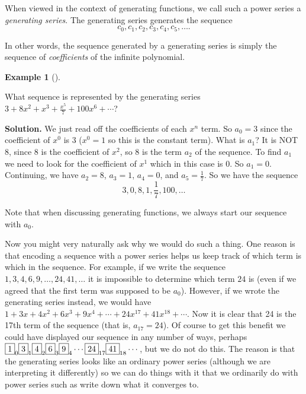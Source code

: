 \documentclass[10pt,]{book}
\theoremstyle{plain}
\theoremstyle{definition}
\newtheorem{example}[theorem]{Example}
\theoremstyle{definition}
\theoremstyle{definition}
\numberwithin{equation}{chapter}
\begin{document}
When viewed in the context of generating functions, we call such a power series a \emph{generating series}. The generating series generates the sequence
\begin{equation*}
  c_0, c_1, c_2, c_3, c_4, c_5, \ldots.
\end{equation*}
%
\par

In other words, the sequence generated by a generating series is simply the sequence of \emph{coefficients} of the infinite polynomial.
%
\begin{example}[]\label{example-109}

What sequence is represented by the generating series \(3 + 8x^2 + x^3 + \frac{x^5}{7} + 100x^6 + \cdots\)?
%
\par\medskip\noindent%
\textbf{Solution.}\quad
We just read off the coefficients of each \(x^n\) term. So \(a_0 = 3\) since the coefficient of \(x^0\) is 3 (\(x^0 = 1\) so this is the constant term). What is \(a_1\)? It is NOT 8, since 8 is the coefficient of \(x^2\), so 8 is the term \(a_2\) of the sequence. To find \(a_1\) we need to look for the coefficient of \(x^1\) which in this case is 0. So \(a_1 = 0\). Continuing, we have \(a_2 = 8\), \(a_3 = 1\), \(a_4 = 0\), and \(a_5 = \frac{1}{7}\). So we have the sequence
\begin{equation*}
  3, 0, 8, 1, \frac{1}{7}, 100, \ldots
\end{equation*}
%
\par

Note that when discussing generating functions, we always start our sequence with \(a_0\).
%
\end{example}
\par

Now you might very naturally ask why we would do such a thing. One reason is that encoding a sequence with a power series helps us keep track of which term is which in the sequence. For example, if we write the sequence \(1, 3, 4, 6, 9, \ldots, 24, 41,\ldots\) it is impossible to determine which term \(24\) is (even if we agreed that the first term was supposed to be \(a_0\)). However, if we wrote the generating series instead, we would have \(1 + 3x + 4x^2 + 6x^3 + 9x^4 + \cdots + 24 x^{17} + 41 x^{18} + \cdots\). Now it is clear that 24 is the 17th term of the sequence (that is, \(a_{17} = 24\)). Of course to get this benefit we could have displayed our sequence in any number of ways, perhaps \(\fbox{1}_0 \fbox{3}_1 \fbox{4}_2 \fbox{6}_3 \fbox{9}_4 \cdots \fbox{24}_{17}\fbox{41}_{18}\cdots\), but we do not do this. The reason is that the generating series looks like an ordinary power series (although we are interpreting it differently) so we can do things with it that we ordinarily do with power series such as write down what it converges to.
%
\par
\end{document}
